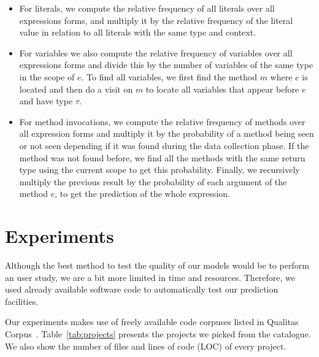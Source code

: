 \documentclass{article} %
\begin{document}
\begin{itemize}
   \item For literals, we compute the relative frequency of all literals over all expressions forms, and multiply it by the relative frequency of the literal value in relation to all literals with the same type and context.
   \item For variables we also compute the relative frequency of variables over all expressions forms and divide this by the number of variables of the same type in the scope of $e$. To find all variables, we first find the method $m$ where $e$ is located and then do a visit on $m$ to locate all variables that appear before $e$ and have type $\tau$.
   \item For method invocations, we compute the relative frequency of methods over all expression forms and multiply it by the probability of a method being seen or not seen depending if it was found during the data collection phase. If the method was not found before, we find all the methods with the same return type using the current scope to get this probability. Finally, we recursively multiply the previous result by the probability of each argument of the method $e$, to get the prediction of the whole expression.
\end{itemize}

\section*{Experiments}

Although the best method to test the quality of our models would be to perform an user study, we are a bit more limited in time and resources. Therefore, we used already available software code to automatically test our prediction facilities.

Our experiments makes use of freely available code corpuses listed in Qualitas Corpus~\cite{QualitasCorpus:APSEC:2010}.
Table~\ref{tab:projects} presents the projects we picked from the catalogue. We also show the number of files and
lines of code (LOC) of every project.
\end{document}
